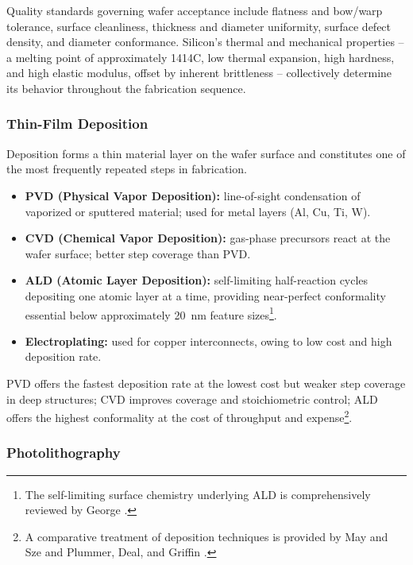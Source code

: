 \documentclass[10pt,a4paper]{article}
\begin{document}
Quality standards governing wafer acceptance include flatness and bow/warp 
tolerance, surface cleanliness, thickness and diameter uniformity, surface 
defect density, and diameter conformance. Silicon's thermal and mechanical 
properties -- a melting point of approximately 1414\textdegree{}C, low thermal 
expansion, high hardness, and high elastic modulus, offset by inherent 
brittleness -- collectively determine its behavior throughout the fabrication 
sequence.

\subsubsection{Thin-Film Deposition}

Deposition forms a thin material layer on the wafer surface and constitutes one 
of the most frequently repeated steps in fabrication. 

\begin{itemize}
    \item \textbf{PVD (Physical Vapor Deposition):} line-of-sight condensation 
    of vaporized or sputtered material; used for metal layers (Al, Cu, Ti, W).
    \item \textbf{CVD (Chemical Vapor Deposition):} gas-phase precursors react 
    at the wafer surface; better step coverage than PVD.
    \item \textbf{ALD (Atomic Layer Deposition):} self-limiting half-reaction 
    cycles depositing one atomic layer at a time, providing near-perfect 
    conformality essential below approximately 20~nm feature 
    sizes\footnote{The self-limiting surface chemistry underlying ALD is 
    comprehensively reviewed by George \cite{george2010}.}.
    \item \textbf{Electroplating:} used for copper interconnects, owing to low 
    cost and high deposition rate.
\end{itemize}

PVD offers the fastest deposition rate at the lowest cost but weaker step 
coverage in deep structures; CVD improves coverage and stoichiometric control; 
ALD offers the highest conformality at the cost of throughput and 
expense\footnote{A comparative treatment of deposition techniques is provided 
by May and Sze \cite{maysze2004} and Plummer, Deal, and Griffin 
\cite{plummer2000}.}.

\subsubsection{Photolithography}
\end{document}
